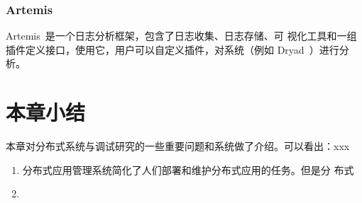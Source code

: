 \subsubsection*{Artemis}

Artemis~\cite{artemis}是一个日志分析框架，包含了日志收集、日志存储、可
视化工具和一组插件定义接口，使用它，用户可以自定义插件，对系统（例如
Dryad~\cite{dryad}）进行分析。

\section{本章小结}

本章对分布式系统与调试研究的一些重要问题和系统做了介绍。可以看出：xxx

\begin{enumerate}

  \item 分布式应用管理系统简化了人们部署和维护分布式应用的任务。但是分
  布式

  \item

\end{enumerate}
